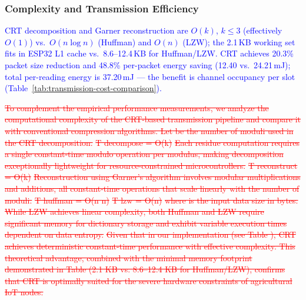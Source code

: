 \documentclass[pdflatex,sn-mathphys-num]{sn-jnl}
\theoremstyle{thmstyleone}
\theoremstyle{thmstyletwo}
\theoremstyle{thmstylethree}
\begin{document}
{\subsubsection{Complexity and Transmission Efficiency}
\label{subsubsec:complexity_analysis}
\textcolor{blue}{CRT decomposition and Garner reconstruction are $O(k)$, $k\leq3$ (effectively $O(1)$) vs.\ $O(n\log n)$ (Huffman) and $O(n)$ (LZW); the 2.1\,KB working set fits in ESP32 L1 cache vs.\ 8.6–12.4\,KB for Huffman/LZW. CRT achieves 20.3\% packet size reduction and 48.8\% per-packet energy saving (12.40 vs.\ 24.21\,mJ); total per-reading energy is 37.20\,mJ — the benefit is channel occupancy per slot (Table~\ref{tab:transmission-cost-comparison}).}

\textcolor{red}{\sout{To complement the empirical performance measurements, we analyze the computational complexity of the CRT-based transmission pipeline and compare it with conventional compression algorithms. Let be the number of moduli used in the CRT decomposition.}}
\textcolor{red}{\sout{T decompose = O(k)}}
\textcolor{red}{\sout{Each residue computation requires a single constant-time modulo operation per modulus, making decomposition exceptionally lightweight for resource-constrained microcontrollers.}}
\textcolor{red}{\sout{T reconstruct = O(k)}}
\textcolor{red}{\sout{Reconstruction using Garner's algorithm involves modular multiplications and additions, all constant-time operations that scale linearly with the number of moduli.}}
\textcolor{red}{\sout{T huffman = O(n n)}}
\textcolor{red}{\sout{T lzw = O(n)}}
\textcolor{red}{\sout{where is the input data size in bytes. While LZW achieves linear complexity, both Huffman and LZW require significant memory for dictionary storage and exhibit variable execution times dependent on data entropy.}}
\textcolor{red}{\sout{Given that in our implementation (see Table ), CRT achieves deterministic constant-time performance with effective complexity. This theoretical advantage, combined with the minimal memory footprint demonstrated in Table (2.1 KB vs. 8.6–12.4 KB for Huffman/LZW), confirms that CRT is optimally suited for the severe hardware constraints of agricultural IoT nodes.}}
}
\end{document}
